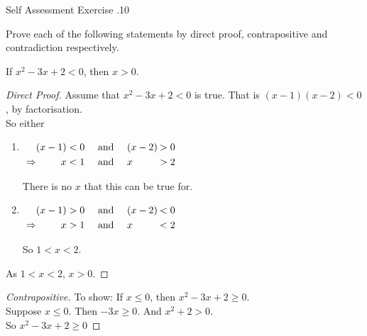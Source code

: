\documentclass[\main/notes.tex]{subfiles}
\begin{document}
				\begin{exercise}{Self Assessment Exercise \thechapter.10}
					\begin{questions}
						\item Prove each of the following statements by direct proof, contrapositive and contradiction respectively.
							\begin{questions}
								\item If $x^{2} - 3x + 2 < 0$, then $x > 0$.
									\begin{answer}
										\begin{proof}[Direct Proof]
											Assume that $x^{2} - 3x + 2 < 0$ is true. That is $(x - 1)(x - 2) < 0$, by factorisation.\\
											So either
											\begin{enumerate}[label=(\roman*)]
												\item 
													$ \begin{alignedat}[t]{3}
														& & (x - 1) &< 0 \quad \text{ and } \quad (x - 2) \: &> 0\\
														& \Rightarrow & x &< 1 \quad \text{ and } \quad x &> 2 
													\end{alignedat} $
													\begin{indentparagraph}
														There is no $x$ that this can be true for.
													\end{indentparagraph}
												\item 
													$ \begin{alignedat}[t]{3}
														& & (x - 1) &> 0 \quad \text{ and } \quad (x - 2) \: &< 0\\
														& \Rightarrow & x &> 1 \quad \text{ and } \quad x &< 2 
													\end{alignedat} $
													\begin{indentparagraph}
														So $1 < x < 2$.
													\end{indentparagraph}
											\end{enumerate}
											As $1 < x < 2$, $x > 0$.
										\end{proof}
										\begin{proof}[Contrapositive]
											To show: If $x \leq 0$, then $x^{2} - 3x + 2 \geq 0$.\\
											Suppose $x \leq 0$. Then $-3x \geq 0$. And $x^{2} + 2 > 0$.\\
											So $x^{2} - 3x + 2 \geq 0$
										\end{proof}

\end{answer}
\end{questions}
\end{questions}
\end{exercise}
\end{document}
